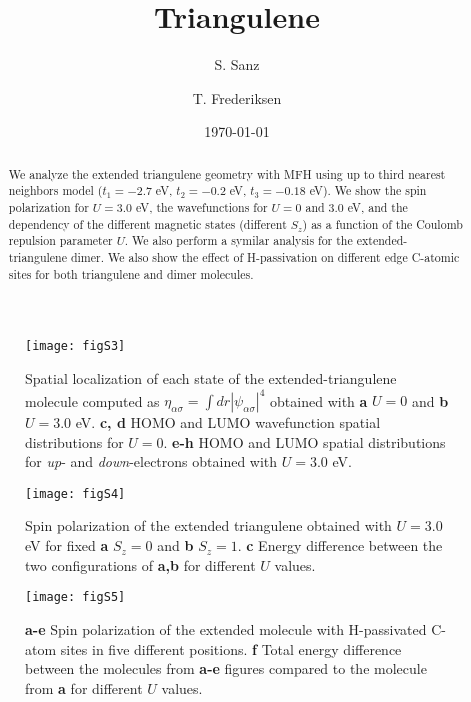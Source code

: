 \documentclass[twocolumn,amsmath,%
amssymb,prb,superscriptaddress]{revtex4}
\begin{document}
\title{Triangulene}

\author{S. Sanz}

\author{T. Frederiksen}

\date{\today}

\begin{abstract}
We analyze the extended triangulene geometry with MFH using up to third nearest neighbors model ($t_{1}=-2.7$ eV, $t_{2}=-0.2$ eV, $t_{3}=-0.18$ eV). We show the spin polarization for $ U=3.0$ eV, the wavefunctions for $U=0$ and $3.0$ eV, and the dependency of the different magnetic states (different $S_{z}$) as a function of the Coulomb repulsion parameter $U$. We also perform a symilar analysis for the extended-triangulene dimer. We also show the effect of H-passivation on different edge C-atomic sites for both triangulene and dimer molecules.
\end{abstract}

\maketitle


\begin{figure*}
	\texttt{[image: figS3]}
	\caption{Spatial localization of each state of the extended-triangulene molecule computed as $\eta_{\alpha\sigma}=\int dr|\psi_{\alpha\sigma}|^{4}$ obtained with \textbf{a} $U=0$ and \textbf{b} $U=3.0$ eV. \textbf{c, d} HOMO and LUMO wavefunction spatial distributions for $U=0$. \textbf{e-h} HOMO and LUMO spatial distributions for \emph{up}- and \emph{down}-electrons obtained with $U=3.0$ eV.}
\end{figure*}

\begin{figure*}
	\texttt{[image: figS4]}
	\caption{Spin polarization of the extended triangulene obtained with $U=3.0$ eV for fixed \textbf{a} $S_{z}=0$ and \textbf{b} $S_{z}=1$. \textbf{c} Energy difference between the two configurations of \textbf{a,b} for different $U$ values.}
\end{figure*}

\begin{figure*}
	\texttt{[image: figS5]}
	\caption{\textbf{a-e} Spin polarization of the extended molecule with H-passivated C-atom sites in five different positions. \textbf{f} Total energy difference between the molecules from \textbf{a-e} figures compared to the molecule from \textbf{a} for different $U$ values.}
\end{figure*}
\end{document}
